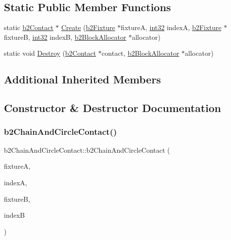 \subsection*{Static Public Member Functions}
\begin{DoxyCompactItemize}
\item 
static \mbox{\hyperlink{classb2_contact}{b2\+Contact}} $\ast$ \mbox{\hyperlink{classb2_chain_and_circle_contact_a9738f9b3eeddb824213abaae78ff6a73}{Create}} (\mbox{\hyperlink{classb2_fixture}{b2\+Fixture}} $\ast$fixtureA, \mbox{\hyperlink{b2_settings_8h_a43d43196463bde49cb067f5c20ab8481}{int32}} indexA, \mbox{\hyperlink{classb2_fixture}{b2\+Fixture}} $\ast$fixtureB, \mbox{\hyperlink{b2_settings_8h_a43d43196463bde49cb067f5c20ab8481}{int32}} indexB, \mbox{\hyperlink{classb2_block_allocator}{b2\+Block\+Allocator}} $\ast$allocator)
\item 
static void \mbox{\hyperlink{classb2_chain_and_circle_contact_a1070fc727a3c52a160c7919c9650b4e3}{Destroy}} (\mbox{\hyperlink{classb2_contact}{b2\+Contact}} $\ast$contact, \mbox{\hyperlink{classb2_block_allocator}{b2\+Block\+Allocator}} $\ast$allocator)
\end{DoxyCompactItemize}
\subsection*{Additional Inherited Members}


\subsection{Constructor \& Destructor Documentation}
\mbox{\label{classb2_chain_and_circle_contact_a7303997b9af2b859346b4fc4d7e107d5}} 
\subsubsection{\texorpdfstring{b2ChainAndCircleContact()}{b2ChainAndCircleContact()}}
{\footnotesize\ttfamily b2\+Chain\+And\+Circle\+Contact\+::b2\+Chain\+And\+Circle\+Contact (\begin{DoxyParamCaption}\item[{\mbox{\hyperlink{classb2_fixture}{b2\+Fixture}} $\ast$}]{fixtureA,  }\item[{\mbox{\hyperlink{b2_settings_8h_a43d43196463bde49cb067f5c20ab8481}{int32}}}]{indexA,  }\item[{\mbox{\hyperlink{classb2_fixture}{b2\+Fixture}} $\ast$}]{fixtureB,  }\item[{\mbox{\hyperlink{b2_settings_8h_a43d43196463bde49cb067f5c20ab8481}{int32}}}]{indexB }\end{DoxyParamCaption})}

